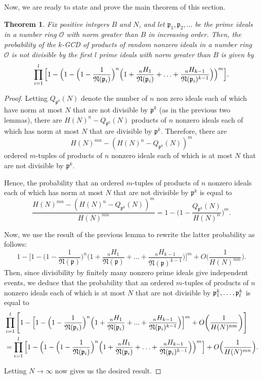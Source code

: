 \documentclass[12pt]{amsart}
\newtheorem{theorem}{Theorem}[subsection]
\theoremstyle{definition}
\newcommand{\f}[1]{\mathfrak{#1}}
\begin{document}
Now, we are ready to state and prove the main theorem of this section.

\begin{theorem}
	Fix positive integers $B$ and $N$, and let $\f{p}_1, \f{p}_2, ...$ be the prime ideals in a number ring $\mathcal{O}$ with norm greater than $B$ in increasing order. Then, the probability of the $k$-GCD of products of random nonzero ideals in a number ring $\mathcal{O}$ is not divisible by the first $l$ prime ideals with norm greater than $B$ is given by 
	$$\prod_{i=1}^{l} \Big[1 - \Big(1 - \Big(1-\frac{1}{\mathfrak{N}(\f{p}_i)}\Big)^n \Big(1+\frac{{}_nH_1}{\f{N}(\f{p}_i)}+\mathellipsis+\frac{{}_nH_{k-1}}{\f{N}(\f{p}_i)^{k-1}}\Big)\Big)^m\Big].$$
\end{theorem}

\begin{proof}
	Letting $Q_{\f{p}^k}(N)$ denote the number of $n$ non zero ideals each of which have norm at most $N$ that are not divisible by $\f{p}^k$ (as in the previous two lemmas), there are $H(N)^n - Q_{\f{p}^k}(N)$ products of $n$ nonzero ideals each of which has norm at most $N$ that are divisible by $\f{p}^k$. Therefore, there are 
	$$H(N)^{mn} - (H(N)^n - Q_{\f{p}^k}(N))^m$$
	ordered $m$-tuples of products of $n$ nonzero ideals each of which is at most $N$ that are not divisible by $\f{p}^k$.
	
	Hence, the probability that an ordered $m$-tuples of products of $n$ nonzero ideals each of which has norm at most $N$ that are not divisible by $\f{p}^k$ is equal to
	$$\frac{H(N)^{mn} - (H(N)^n - Q_{\f{p}^k}(N))^m}{H(N)^{mn}} = 1 - \Big(1 - \frac{Q_{\f{p}^k}(N)}{H(N)^n}\Big)^m.$$
	
	Now, we use the result of the previous lemma to rewrite the latter probability as follows:
	$$1 - \Big[1 - \Big(1 - \frac{1}{\f{N}(\f{p})}\Big)^n \Big(1 + \frac{{}_nH_1}{\f{N}(\f{p})} + ... + \frac{{}_nH_{k-1}}{\f{N}(\f{p})^{k-1}}\Big)\Big]^m+O\bigg(\frac{1}{H(N)^{nm}}\bigg).$$
	Then, since divisibility by finitely many nonzero prime ideals give independent events, we deduce that the probability that an ordered $m$-tuples of products of $n$ nonzero ideals each of which is at most $N$ that are not divisible by $\f{p}_1^k,\mathellipsis,\f{p}_l^k$ is equal to
	\begin{align*} &\prod_{i=1}^l \Bigg[1 - \Big[1 - \Big(1 - \frac{1}{\f{N}(\f{p}_i)}\Big)^n \Big(1 + \frac{{}_nH_1}{\f{N}(\f{p}_i)} + ... + \frac{{}_nH_{k-1}}{\f{N}(\f{p}_i)^{k-1}}\Big)\Big]^m + O\bigg(\frac{1}{H(N)^{nm}}\bigg) \Bigg]\\
		&=\prod_{i=1}^l \Big[1 - \Big(1 -\Big(1-\frac{1}{\f{N}(\f{p}_i)}\Big)^n\Big(1+\frac{{}_nH_1}{\f{N}(\f{p}_i)}+\mathellipsis+\frac{{}_nH_{k-1}}{\f{N}(\f{p}_i)^{k-1}}\Big)\Big)^m\Big] + O\Big(\frac{1}{H(N)^{mn}}\Big). \end{align*}
	
	\noindent Letting $N \to \infty$ now gives us the desired result.
\end{proof}
\end{document}
